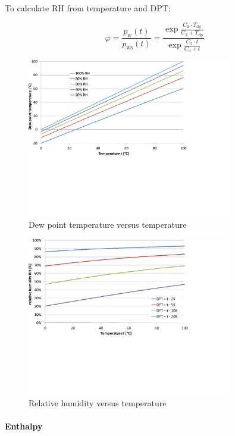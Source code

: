 \documentclass[11pt,a4paper,english,twoside]{scrreprt}
\begin{document}
To calculate RH from temperature and DPT:

\[
\varphi =\frac{p_\text{w}(t)}{p_\text{ws}(t)} =\frac{\exp \frac{C_2 \cdot T_\text{dp}}{C_3 +T_\text{dp}}}{\exp \frac{C_2 \cdot t}{C_3 +t}} 
\]

\begin{figure}
  \centering
  \includegraphics*[width=0.8\textwidth,angle=0]{FCF_Diag_DPT.pdf}
  \caption[Dew point temperature versus temperature]{Dew point temperature versus temperature}
\end{figure}

\begin{figure}
  \centering
  \includegraphics*[width=0.8\textwidth,angle=0]{FCF_Diag_DPT2.pdf}
  \caption[Relative humidity versus temperature]{Relative humidity versus temperature}
\end{figure}


\paragraph{Enthalpy}
\end{document}
